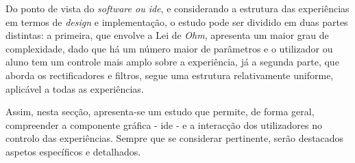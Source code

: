 






Do ponto de vista do \textit{software ou \acrshort{ide}}, e considerando a estrutura das experiências em termos de \textit{design} e implementação, o estudo pode ser dividido em duas partes distintas: a primeira, que envolve a Lei de \textit{Ohm}, apresenta um maior grau de complexidade, dado que há um número maior de parâmetros e o utilizador ou aluno tem um controle mais amplo sobre a experiência, já a segunda parte, que aborda os rectificadores e filtros, segue uma estrutura relativamente uniforme, aplicável a todas as experiências.

Assim, nesta secção, apresenta-se um estudo que permite, de forma geral, compreender a componente gráfica - \acrshort{ide} - e a interacção dos utilizadores no controlo das experiências. Sempre que se considerar pertinente, serão destacados aspetos específicos e detalhados.


